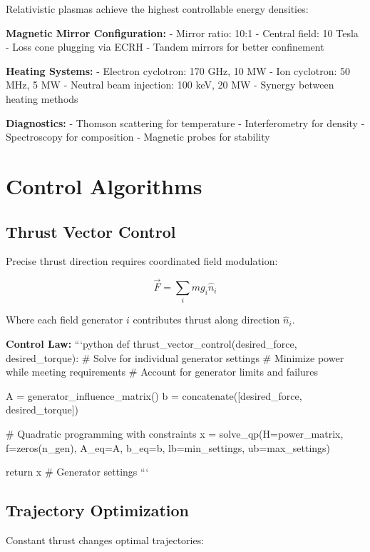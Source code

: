 \documentclass[12pt,letterpaper]{book}
\theoremstyle{definition}
\theoremstyle{plain}
\theoremstyle{remark}
\begin{document}
{{{{{Relativistic plasmas achieve the highest controllable energy densities:

\textbf{Magnetic Mirror Configuration:}
- Mirror ratio: 10:1
- Central field: 10 Tesla
- Loss cone plugging via ECRH
- Tandem mirrors for better confinement

\textbf{Heating Systems:}
- Electron cyclotron: 170 GHz, 10 MW
- Ion cyclotron: 50 MHz, 5 MW
- Neutral beam injection: 100 keV, 20 MW
- Synergy between heating methods

\textbf{Diagnostics:}
- Thomson scattering for temperature
- Interferometry for density
- Spectroscopy for composition
- Magnetic probes for stability

\section{Control Algorithms}

\subsection{Thrust Vector Control}

Precise thrust direction requires coordinated field modulation:

\begin{equation}
\vec{F} = \sum_i m g_i \hat{n}_i
\end{equation}

Where each field generator $i$ contributes thrust along direction $\hat{n}_i$.

\textbf{Control Law:}
```python
def thrust_vector_control(desired_force, desired_torque):
    # Solve for individual generator settings
    # Minimize power while meeting requirements
    # Account for generator limits and failures
    
    A = generator_influence_matrix()
    b = concatenate([desired_force, desired_torque])
    
    # Quadratic programming with constraints
    x = solve_qp(H=power_matrix, f=zeros(n_gen), 
                 A_eq=A, b_eq=b,
                 lb=min_settings, ub=max_settings)
    
    return x  # Generator settings
```

\subsection{Trajectory Optimization}

Constant thrust changes optimal trajectories:

}}}}}
\end{document}
